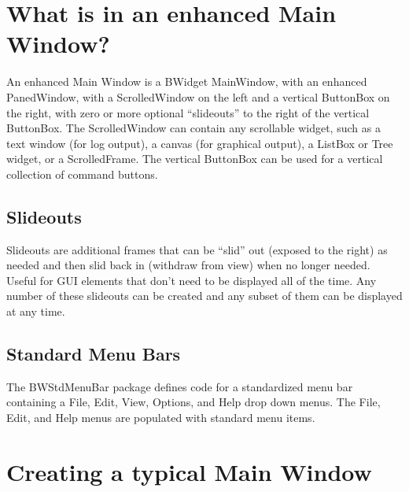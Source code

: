 \section{What is in an enhanced Main Window?}
\label{sec:Main:WhatIsIn}

An enhanced Main Window is a BWidget MainWindow, with an enhanced
PanedWindow, with a ScrolledWindow on the left and a vertical ButtonBox
on the right, with zero or more optional ``slideouts'' to the right of
the vertical ButtonBox.  The ScrolledWindow can contain any scrollable
widget, such as a text window (for log output), a canvas (for graphical
output), a ListBox or Tree widget, or a ScrolledFrame.  The vertical
ButtonBox can be used for a vertical collection of command buttons.

\subsection{Slideouts}
\label{sec:Main:Slideouts}

Slideouts are additional frames that can be ``slid'' out (exposed to
the right) as needed and then slid back in (withdraw from view) when no
longer needed.  Useful for GUI elements that don't need to be displayed
all of the time.  Any number of these slideouts can be created and any
subset of them can be displayed at any time.

\subsection{Standard Menu Bars}
\label{sec:Main:StdMenuBar}

The BWStdMenuBar package defines code for a standardized menu bar
containing a File, Edit, View, Options, and Help drop down menus.  The
File, Edit, and Help menus are populated with standard menu items.


\section{Creating a typical Main Window}
\label{sec:Main:SampleMainWindow}


